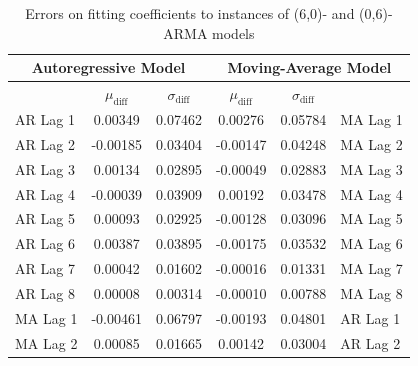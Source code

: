 \documentclass[oneside,12pt,openany]{book}
\begin{document}
    \begin{table}[!ht]
        \centering
        \begin{tabular}{|l|c|c|c|c|l|}
            \hline
            \multicolumn{3}{|c|}{\textbf{Autoregressive Model}}   & \multicolumn{3}{c|}{\textbf{Moving-Average Model}}     \\ \hline
            \cellcolor{black} & $\mu_{\text{diff}}$ & $\sigma_{\text{diff}}$ & $\mu_{\text{diff}}$ & $\sigma_{\text{diff}}$ & \cellcolor{black}         \\ \hline
            AR Lag 1 & 0.00349                  & 0.07462                    & 0.00276                  & 0.05784                    & MA Lag 1 \\ \hline
            AR Lag 2 & -0.00185                 & 0.03404                    & -0.00147                 & 0.04248                    & MA Lag 2 \\ \hline
            AR Lag 3 & 0.00134                  & 0.02895                    & -0.00049                 & 0.02883                    & MA Lag 3 \\ \hline
            AR Lag 4 & -0.00039                 & 0.03909                    & 0.00192                  & 0.03478                    & MA Lag 4 \\ \hline
            AR Lag 5 & 0.00093                  & 0.02925                    & -0.00128                 & 0.03096                    & MA Lag 5 \\ \hline
            AR Lag 6 & 0.00387                  & 0.03895                    & -0.00175                 & 0.03532                    & MA Lag 6 \\ \hline
            AR Lag 7 & 0.00042                  & 0.01602                    & -0.00016                 & 0.01331                    & MA Lag 7 \\ \hline
            AR Lag 8 & 0.00008                   & 0.00314                    & -0.00010                  & 0.00788                    & MA Lag 8 \\ \hline
            MA Lag 1 & -0.00461                 & 0.06797                    & -0.00193                 & 0.04801                    & AR Lag 1 \\ \hline
            MA Lag 2 & 0.00085                  & 0.01665                    & 0.00142                  & 0.03004                    & AR Lag 2 \\ \hline
        \end{tabular}
        \caption{Errors on fitting coefficients to instances of (6,0)- and (0,6)-ARMA models}
        \label{tab:errortsfitting6}
    \end{table}
    
\end{document}
